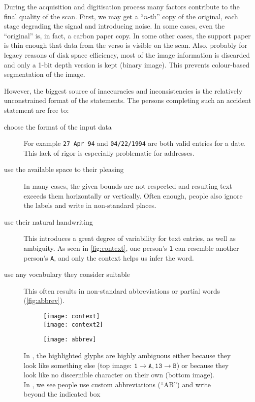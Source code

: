 	During the acquisition and digitisation process many factors contribute to the final quality of the scan. First, we may get a ``$n$-th'' copy of the original, each stage degrading the signal and introducing noise. In some cases, even the ``original'' is, in fact, a carbon paper copy. In some other cases, the support paper is thin enough that data from the verso is visible on the scan. Also, probably for legacy reasons of disk space efficiency, most of the image information is discarded and only a 1-bit depth version is kept (binary image). This prevents colour-based segmentation of the image.

	However, the biggest source of inaccuracies and inconsistencies is the relatively unconstrained format of the statements. The persons completing such an accident statement are free to:
	\begin{description}
		\item[choose the format of the input data] For example \texttt{27 Apr 94} and \texttt{04/22/1994} are both valid entries for a date. This lack of rigor is especially problematic for addresses.

		\item[use the available space to their pleasing] In many cases, the given bounds are not respected and resulting text exceeds them horizontally or vertically. Often enough, people also ignore the labels and write in non-standard places.

		\item[use their natural handwriting] \label{itm:natural_handwriting} This introduces a great degree of variability for text entries, as well as ambiguity. As seen in \autoref{fig:context}, one person's \texttt{1} can resemble another person's \texttt{A}, and only the context helps us infer the word.

		\item[use any vocabulary they consider suitable] This often results in non-standard abbreviations or partial words (\autoref{fig:abbrev}).
	\end{description}

	\begin{figure}
		\begin{subfigure}[b]{.5\linewidth}
			\centering
			\texttt{[image: context]}\\
			\texttt{[image: context2]}
			\caption{}\label{fig:context}
		\end{subfigure}
		\begin{subfigure}[b]{.48\linewidth}
			\texttt{[image: abbrev]}
			\caption{}\label{fig:abbrev}
		\end{subfigure}
		\caption[Ambiguity in handwriting]{In , the highlighted glyphs are highly ambiguous either because they look like something else (top image: \(\mathtt{1} \rightarrow \mathtt{A}, \mathtt{13} \rightarrow \mathtt{B} \)) or because they look like no discernible character on their own (bottom image).\\
		In , we see people use custom abbreviations (``AB'') and write beyond the indicated box}
	\end{figure}


